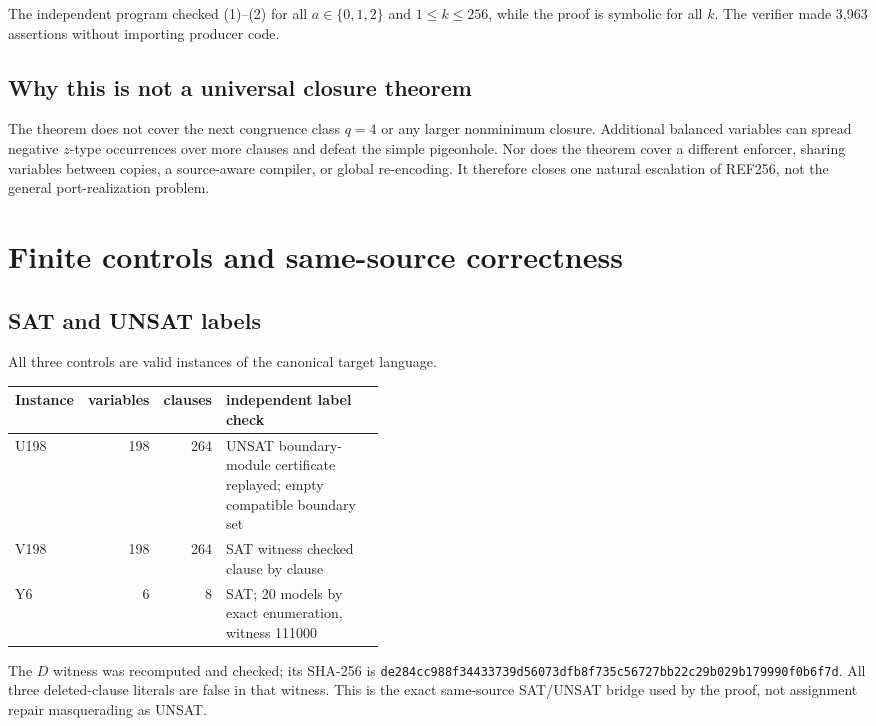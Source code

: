 \documentclass[11pt]{article}
\begin{document}
The independent program checked (1)--(2) for all $a\in\{0,1,2\}$ and $1\leq k\leq256$, while the proof is symbolic for all $k$.  The verifier made 3,963 assertions without importing producer code.

\subsection{Why this is not a universal closure theorem}
The theorem does not cover the next congruence class $q=4$ or any larger nonminimum closure.  Additional balanced variables can spread negative $z$-type occurrences over more clauses and defeat the simple pigeonhole.  Nor does the theorem cover a different enforcer, sharing variables between copies, a source-aware compiler, or global re-encoding.  It therefore closes one natural escalation of REF256, not the general port-realization problem.

\section{Finite controls and same-source correctness}

\subsection{SAT and UNSAT labels}
All three controls are valid instances of the canonical target language.
\begin{center}
\begin{tabular}{lrrp{0.43\linewidth}}
\toprule
Instance & variables & clauses & independent label check \\
\midrule
U198 & 198 & 264 & UNSAT boundary-module certificate replayed; empty compatible boundary set \\
V198 & 198 & 264 & SAT witness checked clause by clause \\
Y6 & 6 & 8 & SAT; 20 models by exact enumeration, witness 111000 \\
\bottomrule
\end{tabular}
\end{center}
The $D$ witness was recomputed and checked; its SHA-256 is
\nolinkurl{de284cc988f34433739d56073dfb8f735c56727bb22c29b029b179990f0b6f7d}.
All three deleted-clause literals are false in that witness.  This is the exact same-source SAT/UNSAT bridge used by the proof, not assignment repair masquerading as UNSAT.
\end{document}
